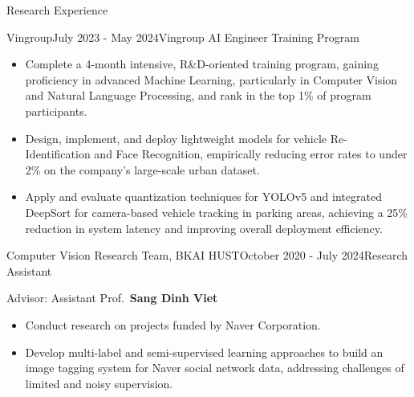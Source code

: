 \documentclass{resume} %
\begin{document}
\begin{rSection}{Research Experience}
    \begin{rSubsectionNoBullet}{Vingroup}{July 2023 - May 2024}{Vingroup AI Engineer Training Program}{}
        \item
            \begin{itemize}
                \item {Complete a 4-month intensive, R\&D-oriented training program, gaining proficiency in advanced Machine Learning, particularly in Computer Vision and Natural Language Processing, and rank in the top 1\% of program participants.}
                \item {Design, implement, and deploy lightweight models for vehicle Re-Identification and Face Recognition, empirically reducing error rates to under 2\% on the company’s large-scale urban dataset.}
                \item {Apply and evaluate quantization techniques for YOLOv5 and integrated DeepSort for camera-based vehicle tracking in parking areas, achieving a 25\% reduction in system latency and improving overall deployment efficiency.}
            \end{itemize}
    \end{rSubsectionNoBullet}

    \begin{rSubsectionNoBullet}{Computer Vision Research Team, BKAI HUST}{October 2020 - July 2024}{Research Assistant}{}
        \item Advisor: Assistant Prof.\ \textbf{Sang Dinh Viet}
            \begin{itemize}
                \item {Conduct research on projects funded by Naver Corporation.}
                \item {Develop multi-label and semi-supervised learning approaches to build an image tagging system for Naver social network data, addressing challenges of limited and noisy supervision.}
            \end{itemize}
    \end{rSubsectionNoBullet}
    
\end{rSection}
\end{document}
